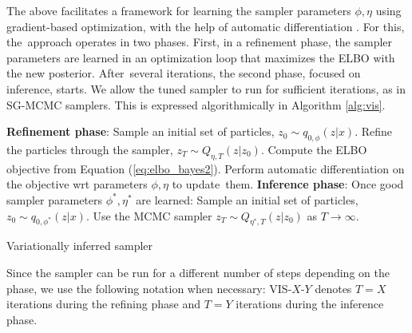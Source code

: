 The above facilitates a framework for learning the sampler parameters $\phi, \eta$ using gradient-based optimization, with the help of automatic differentiation \parencite{baydin2017automatic}.
For this, the~approach operates in two phases.
First, in a refinement phase, the sampler parameters are learned in an optimization loop that maximizes the ELBO with the new posterior. After~several iterations, the second phase,
focused on inference, starts.
We allow the tuned sampler to run for
sufficient iterations, as in SG-MCMC samplers.
This is expressed algorithmically in Algorithm \ref{alg:vis}.

\begin{algorithm}[!ht]
\begin{algorithmic}[1]
\State \textbf{Refinement phase}:
\hspace{0.5cm}
  \State Sample an initial set of particles, $z_0 \sim q_{0,\phi}(z|x)$.
\State Refine the particles through the sampler, $z_T \sim Q_{\eta, T}(z|z_0)$.
\State  Compute the ELBO objective from Equation (\ref{eq:elbo_bayes2}).
\State   Perform automatic differentiation on the objective wrt parameters $\phi, \eta$ to update~them.
 \EndWhile
 \State 
 \State \textbf{Inference phase}:
 \State \hspace{0.cm}Once good sampler parameters $\phi^*, \eta^*$ are learned:
 \State \hspace{0.6cm} Sample an initial set of particles, $z_0 \sim q_{0,\phi^*}(z|x)$.
 \State \hspace{0.6cm} Use the MCMC sampler $z_T \sim Q_{\eta^*, T}(z|z_0)$ as $T \rightarrow \infty$.
\end{algorithmic}
 \caption{Variationally inferred sampler}\label{alg:vis}
\end{algorithm}


\noindent Since the sampler can be run for a different number of steps depending on the phase, we use the following notation when necessary: VIS-$X$-$Y$ denotes $T = X$ iterations during the refining phase and $T=Y$ iterations during the inference phase.


